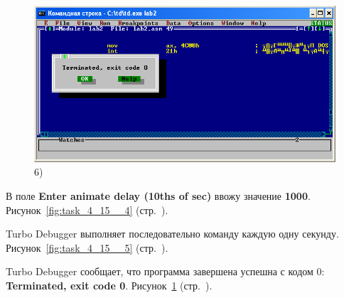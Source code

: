 \begin{figure}[!htp]
\begin {minipage}{0.32\textwidth}
    \end{minipage}
    \begin {minipage}{0.32\textwidth}
        \centering
        \includegraphics[width=.99\linewidth]
            {../_INCLUDES/task-4-15/6.png}
        \caption{6) }
        \label{fig:task_4_15__6}
    \end{minipage}
\end{figure}

В поле \textbf{Enter animate delay (10ths of sec)} ввожу значение \textbf{1000}.
Рисунок~\ref{fig:task_4_15__4} (стр.~\pageref{fig:task_4_15__4}).

Turbo Debugger выполняет последовательно команду каждую одну секунду.
Рисунок~\ref{fig:task_4_15__5} (стр.~\pageref{fig:task_4_15__5}).

Turbo Debugger сообщает, что программа завершена успешна с кодом 0: \textbf{Terminated, exit code 0}.
Рисунок~\ref{fig:task_4_15__6} (стр.~\pageref{fig:task_4_15__6}).
